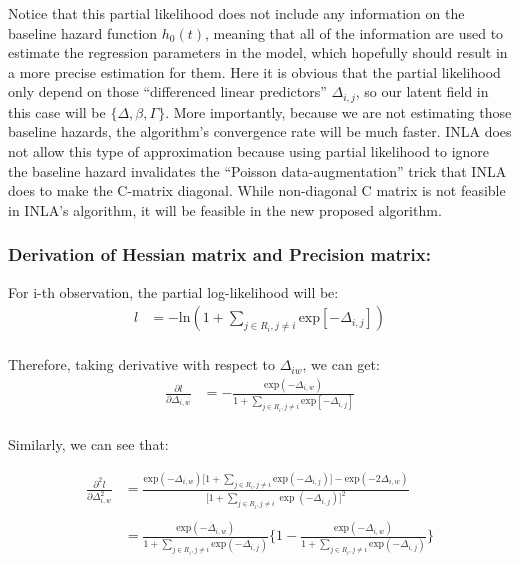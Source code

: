 \documentclass[]{article}
\begin{document}
Notice that this partial likelihood does not include any information on
the baseline hazard function \(h_0(t)\), meaning that all of the
information are used to estimate the regression parameters in the model,
which hopefully should result in a more precise estimation for them.
Here it is obvious that the partial likelihood only depend on those
``differenced linear predictors'' \(\Delta_{i,j}\), so our latent field
in this case will be \(\{ \Delta,\beta,\Gamma \}\). More importantly,
because we are not estimating those baseline hazards, the algorithm's
convergence rate will be much faster. INLA does not allow this type of
approximation because using partial likelihood to ignore the baseline
hazard invalidates the ``Poisson data-augmentation'' trick that INLA
does to make the C-matrix diagonal. While non-diagonal C matrix is not
feasible in INLA's algorithm, it will be feasible in the new proposed
algorithm.

\hypertarget{derivation-of-hessian-matrix-and-precision-matrix}{%
\subsubsection{Derivation of Hessian matrix and Precision
matrix:}\label{derivation-of-hessian-matrix-and-precision-matrix}}

For i-th observation, the partial log-likelihood will be:
\begin{equation}\begin{aligned}\label{eqn:ithPart}
l &= -\text{ln}(1+{\sum_{j\in R_i, j \ne i}^{}\text{exp}[-\Delta_{i,j}]}) \\
\end{aligned}\end{equation}

Therefore, taking derivative with respect to \(\Delta_{iw}\), we can
get: \begin{equation}\begin{aligned}\label{eqn:derivofPart}
\frac{\partial l}{\partial \Delta_{i,w}} &= -\frac{\text{exp}(-\Delta_{i,w})}{1+{\sum_{j\in R_i, j \ne i}^{}\text{exp}[-\Delta_{i,j}]}} \\
\end{aligned}\end{equation}

Similarly, we can see that:

\begin{equation}\begin{aligned}\label{eqn:secderivofPart}
\frac{\partial^2 l}{\partial \Delta_{i,w}^2} &= \frac{\text{exp}(-\Delta_{i,w})\big[1+ \sum_{j\in R_i,j\ne i}\text{exp}(-\Delta_{i,j})\big]-\text{exp}(-2\Delta_{i,w})}{\big[1+\sum_{j\in R_i,j \ne i}\exp(-\Delta_{i,j})\big]^2} \\
\\
                                            &= \frac{\text{exp}(-\Delta_{i,w})}{1+ \sum_{j\in R_i,j\ne i}\text{exp}(-\Delta_{i,j})} \bigg\{1-\frac{\text{exp}(-\Delta_{i,w})}{1+ \sum_{j\in R_i,j\ne i}\text{exp}(-\Delta_{i,j})}\bigg \} \\
\end{aligned}\end{equation}
\end{document}
